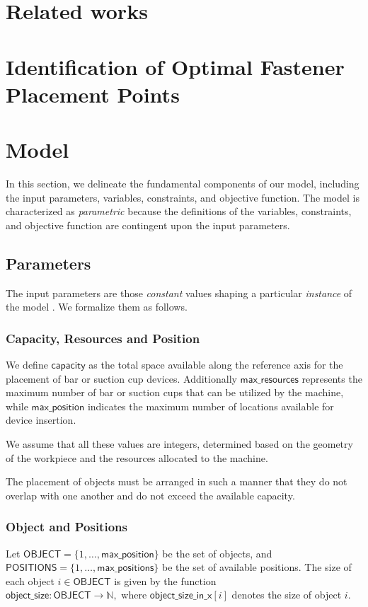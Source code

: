\documentclass[runningheads]{llncs}
\begin{document}
\section{Related works}

\section{Identification of Optimal Fastener Placement Points}

\section{Model}
In this section, we delineate the fundamental components of our model, including the input parameters, variables, constraints, and objective function. The model is characterized as \textit{parametric} because the definitions of the variables, constraints, and objective function are contingent upon the input parameters.

\subsection{Parameters}
The input parameters are those \textit{constant} values shaping a particular \textit{instance} of the model \cite{wallace2020building}. We formalize them as follows.

\subsubsection{Capacity, Resources and Position}
We define \(\mathsf{capacity}\) as the total space available along the reference axis for the placement of bar or suction cup devices. Additionally \(\mathsf{max\_resources}\) represents the maximum number of bar or suction cups that can be utilized by the machine, while \(\mathsf{max\_position}\) indicates the maximum number of locations available for device insertion. 

We assume that all these values are integers, determined based on the geometry of the workpiece and the resources allocated to the machine. 

The placement of objects must be arranged in such a manner that they do not overlap with one another and do not exceed the available capacity.


\subsubsection{Object and Positions}
Let \(\mathsf{OBJECT} = \{1, \dots,  \mathsf{max\_position}\}\) be the set of objects, and \(\mathsf{POSITIONS} = \{1, \dots, \mathsf{max\_positions}\}\) be the set of available positions. The size of each object \(i \in \mathsf{OBJECT}\) is given by the function \\\(\mathsf{object\_size} \colon \mathsf{OBJECT} \to \mathbb{N},\) where \(\mathsf{object\_size\_in\_x}[i]\) denotes the size of object \(i\). 
\end{document}
